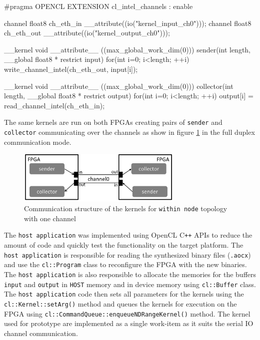 \begin{CppCode} [caption=Kernels for \texttt{within node} prototype, frame=tlrb, label=code:within_node]
#pragma OPENCL EXTENSION cl_intel_channels : enable

channel float8 ch_eth_in __attribute((io("kernel_input_ch0")));
channel float8 ch_eth_out __attribute((io("kernel_output_ch0")));

__kernel void __attribute__ ((max_global_work_dim(0)))
sender(int length, __global float8 * restrict input)
{
    for(int i=0; i<length; ++i)
        write_channel_intel(ch_eth_out, input[i]);
}

__kernel void __attribute__ ((max_global_work_dim(0)))
collector(int length, __global float8 * restrict output)
{
    for(int i=0; i<length; ++i)
        output[i] = read_channel_intel(ch_eth_in);
}
\end{CppCode}

The same kernels are run on both FPGAs creating pairs of \texttt{sender}
and \texttt{collector} communicating over the channels as show in
figure \ref{fig:send_rcv} in the full duplex communication mode.

\begin{figure}[h]%
    \centering
    \includegraphics[width=0.7\textwidth]{images/send_recv}
    \caption{Communication structure of the kernels for \texttt{within node} topology with one channel}
    \label{fig:send_rcv}
\end{figure}

The \texttt{host application} was implemented using OpenCL C\texttt{+}\texttt{+} APIs to reduce the amount
of code and quickly test the functionality on the target platform. The \texttt{host application}
is responsible for reading the synthesized binary files (\texttt{.aocx}) and use the
\texttt{cl::Program} class to reconfigure the FPGA with the new binaries. The \texttt{host application}
is also responsible to allocate the memories for the buffers \texttt{input} and
\texttt{output} in \texttt{HOST} memory and in device memory using \texttt{cl::Buffer} class.
The \texttt{host application} code then sets all parameters for the kernels using the \texttt{cl::Kernel::setArg()}
method and queues the kernels for execution on the FPGA using \texttt{cl::CommandQueue::enqueueNDRangeKernel()}
method. The kernel used for prototype are implemented as a single work-item as it suits the
serial IO channel communication.


